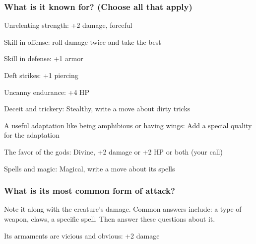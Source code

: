        
\stopitemize
       
\subsubsection{What is it known for? (Choose all that apply)}    
       
\startitemize[1,packed]
         
\item Unrelenting strength: +2 damage, forceful

         
\item Skill in offense: roll damage twice and take the best

         
\item Skill in defense: +1 armor

         
\item Deft strikes: +1 piercing

         
\item Uncanny endurance: +4 HP

         
\item Deceit and trickery: Stealthy, write a move about dirty tricks

         
\item A useful adaptation like being amphibious or having wings: Add a special quality for the adaptation

         
\item The favor of the gods: Divine, +2 damage or +2 HP or both (your call)

         
\item Spells and magic: Magical, write a move about its spells

       
\stopitemize
       
\subsubsection{What is its most common form of attack?}     
       

Note it along with the creature's damage. Common answers include: a type of weapon, claws, a specific spell. Then answer these questions about it.

       
\startitemize[1,packed]
         
\item Its armaments are vicious and obvious: +2 damage

